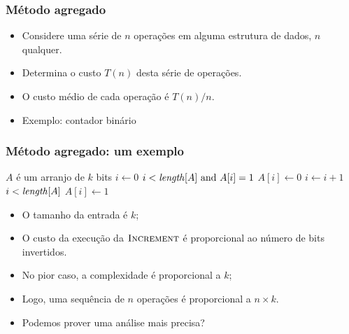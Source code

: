 \documentclass[handout]{beamer}
\begin{document}
\begin{frame}

\frametitle{Método agregado}

\begin{itemize}
\item Considere uma série de $n$ operações em alguma estrutura de dados, $n$
  qualquer.

\item Determina o custo $T(n)$ desta série de operações.

\item O custo médio de cada operação é $T(n)/n$.

\item Exemplo: contador binário
\end{itemize}

\end{frame}

\begin{frame}

\frametitle{Método agregado: um exemplo}

  \begin{codebox}
    \zi \Comment $A$ é um arranjo de $k$ bits
    \li $i \gets 0$
    \li \While $i < \id{length}[A] \mbox{ and } A[i] = 1$
    \li \Do 
    \li   $A[i] \gets 0$
    \li   $i \gets i + 1$
        \End
    \li \If $i < \id{length}[A]$
    \li \Then
    \li    $A[i] \gets 1$
        \End
  \end{codebox}

\begin{itemize}
\item O tamanho da entrada é $k$;
\item O custo da execução da $\textnormal{\scshape Increment}$ é proporcional ao número de bits
  invertidos.
\item No pior caso, a complexidade é proporcional a $k$;
\item Logo, uma sequência de $n$ operações é proporcional a $n \times k$.
\pause
\item Podemos prover uma análise mais precisa?
\end{itemize}

\end{frame}
\end{document}
